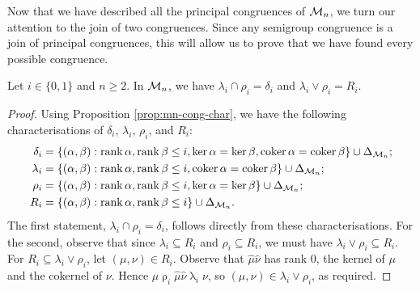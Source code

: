 Now that we have described all the principal congruences of $\mathcal{M}_n$, we turn
our attention to the join of two congruences.  Since any semigroup congruence is
a join of principal congruences, this will allow us to prove that we have found
every possible congruence.

\begin{lemma}
  \label{lem:mn-lattice-intra}
  Let $i \in \{0, 1\}$ and $n \geq 2$.  In $\mathcal{M}_n$, we have $\lambda_i \cap \rho_i = \delta_i$
  and $\lambda_i \vee \rho_i = R_i$.
  \begin{proof}
    Using Proposition \ref{prop:mn-cong-char}, we have the following
    characterisations of $\delta_i$, $\lambda_i$, $\rho_i$, and $R_i$:
    \begin{align*}
      \delta_i &= \{(\alpha,\beta) :
                    \operatorname{rank}\alpha,\operatorname{rank}\beta \leq i,
                    \ker\alpha = \ker\beta,
                    \operatorname{coker}\alpha = \operatorname{coker}\beta\} \cup \Delta_{\mathcal{M}_n}; \\
      \lambda_i &= \{(\alpha,\beta) :
                     \operatorname{rank}\alpha,\operatorname{rank}\beta \leq i,
                     \operatorname{coker}\alpha = \operatorname{coker}\beta\} \cup \Delta_{\mathcal{M}_n}; \\
      \rho_i &= \{(\alpha,\beta) :
                  \operatorname{rank}\alpha,\operatorname{rank}\beta \leq i,
                  \ker\alpha = \ker\beta\} \cup \Delta_{\mathcal{M}_n}; \\
      R_i &= \{(\alpha,\beta) :
               \operatorname{rank}\alpha,\operatorname{rank}\beta \leq i\} \cup \Delta_{\mathcal{M}_n}.
    \end{align*}
    The first statement, $\lambda_i \cap \rho_i = \delta_i$, follows directly
    from these characterisations.  For the second, observe that since
    $\lambda_i \subseteq R_i$ and $\rho_i \subseteq R_i$, we must have
    $\lambda_i \vee \rho_i \subseteq R_i$.  For
    $R_i \subseteq \lambda_i \vee \rho_i$, let $(\mu,\nu) \in R_i$.  Observe
    that $\widehat\mu\widehat\nu$ has rank $0$, the kernel of $\mu$ and the
    cokernel of $\nu$.  Hence
    $\mu \mathrel\rho_i \widehat\mu\widehat\nu \mathrel\lambda_i \nu$, so
    $(\mu, \nu) \in \lambda_i \vee \rho_i$, as required.
  \end{proof}
\end{lemma}

